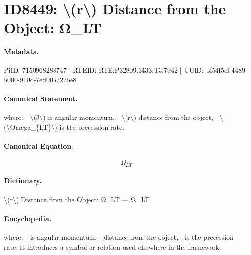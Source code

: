 \section*{ID8449: \textbackslash{}(r\textbackslash{}) Distance from the Object: Ω\_LT}
\paragraph{Metadata.}
PiID: 7150968288747 | RTEID: RTE:P32809.3433:T3.7942 | UUID: bf54f5cf-4489-5000-910d-7ed0057275e8

\paragraph{Canonical Statement.}
where: - \textbackslash{}(J\textbackslash{}) is angular momentum, - \textbackslash{}(r\textbackslash{}) distance from the object, - \textbackslash{}(\textbackslash{}Omega\_\{LT\}\textbackslash{}) is the precession rate.

\paragraph{Canonical Equation.}
\[
\Omega_{LT}
\]

\paragraph{Dictionary.}
\textbackslash{}(r\textbackslash{}) Distance from the Object: Ω\_LT — Ω\_LT

\paragraph{Encyclopedia.}
where: - is angular momentum, - distance from the object, - is the precession rate. It introduces a symbol or relation used elsewhere in the framework.
